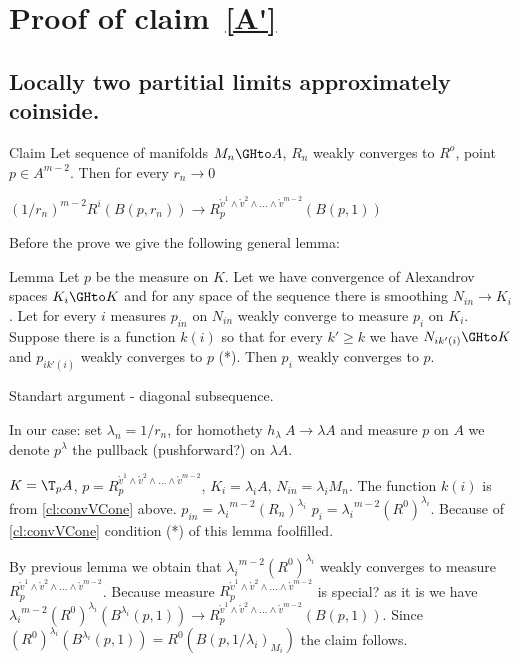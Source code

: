 \section{Proof of claim~\ref{A'}}\label{sec:codim2}
\subsection{Locally two partitial limits approximately coinside.}
\begin{thm}{Claim}\label{cl:convLocCodim2}
Let sequence of manifolds $M_n\GHto A$,
$R_n$ weakly converges to $R^o$,
point $p\in A^{m-2}$. Then
for every  $r_n\to 0$

$(1/r_n)^{m-2}R^i(B(p,r_n))\to R_p^{\mathring{v}^1\wedge \mathring{v}^2\wedge\dots\wedge \mathring{v}^{m-2}}(B(p,1))$

\end{thm}

Before the prove we give the following general lemma:

\begin{thm}{Lemma}
Let $p $ be the measure on $K$.
Let we have convergence of Alexandrov spaces $K_i\GHto K$
  and for  any space of the sequence there is smoothing $N_{in}\to  K_i$.
Let for every $i$ measures $p_{in}$ on $N_{in}$ weakly
converge to measure $p_i$ on $K_i$.
Suppose there is a function $k(i)$ so that
for every $k'\ge k$ we
have $N_{i k'(i)}\GHto K$ and
$p_{i k'(i)}$ weakly converges to $p$ (*).
Then $p_i$ weakly converges to $p$.

\end{thm}

 Standart argument - diagonal subsequence. \qeds

In our case: set $\lambda_n=1/r_n$,
for homothety $h_\lambda\:A\to \lambda A$ and measure
$p$ on $A$ we denote $p^\lambda$ the pullback (pushforward?) on  $\lambda A$.


$K={\T_p A}$, $p=R_p^{\mathring{v}^1\wedge \mathring{v}^2\wedge\dots\wedge
\mathring{v}^{m-2}}$,  $K_i={\lambda_i A}$,
$N_{in}=\lambda_i M_n$. The function $k(i)$ is
from \ref{cl:convVCone} above.
$p_{in}={\lambda_i}^{m-2}(R_n)^{\lambda_i}$
$p_i={\lambda_i}^{m-2}(R^0)^{\lambda_i}$.
Because of \ref{cl:convVCone} condition (*) of this lemma foolfilled.

By previous lemma we obtain that
${\lambda_i}^{m-2}(R^0)^{\lambda_i}$ weakly converges to measure
$R_p^{\mathring{v}^1\wedge \mathring{v}^2\wedge\dots\wedge
\mathring{v}^{m-2}}$.
Because measure $R_p^{\mathring{v}^1\wedge \mathring{v}^2\wedge\dots\wedge
\mathring{v}^{m-2}}$ is special? as it is
we have ${\lambda_i}^{m-2}(R^0)^{\lambda_i}(B^{\lambda_i}(p,1))\to R_p^{\mathring{v}^1\wedge \mathring{v}^2\wedge\dots\wedge \mathring{v}^{m-2}}(B(p,1))$.
Since $(R^0)^{\lambda_i}(B^{\lambda_i}(p,1))=R^0(B(p,1/\lambda_i)_{M_i})$
the claim follows.
\qeds

